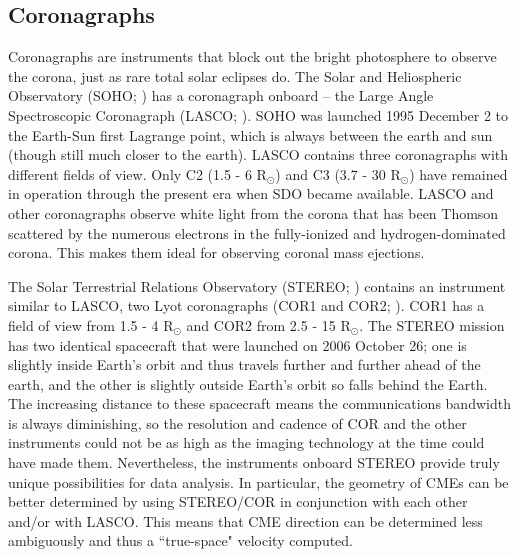 \subsection{Coronagraphs}
Coronagraphs are instruments that block out the bright photosphere to observe the corona, just as rare total solar eclipses do. The Solar and Heliospheric Observatory (SOHO; \citealt{Domingo1995}) has a coronagraph onboard -- the Large Angle Spectroscopic Coronagraph (LASCO; \citealt{Brueckner1995}). SOHO was launched 1995 December 2 to the Earth-Sun first Lagrange point, which is always between the earth and sun (though still much closer to the earth). LASCO contains three coronagraphs with different fields of view. Only C2 (1.5 - 6 R$_\odot$) and C3 (3.7 - 30 R$_\odot$) have remained in operation through the present era when SDO became available. LASCO and other coronagraphs observe white light from the corona that has been Thomson scattered by the numerous electrons in the fully-ionized and hydrogen-dominated corona. This makes them ideal for observing coronal mass ejections. 

The Solar Terrestrial Relations Observatory (STEREO; \citealt{Kaiser2007}) contains an instrument similar to LASCO, two Lyot coronagraphs (COR1 and COR2; \citealt{Howard2008}). COR1 has a field of view from 1.5 - 4 R$_\odot$ and COR2 from 2.5 - 15 R$_\odot$. The STEREO mission has two identical spacecraft that were launched on 2006 October 26; one is slightly inside Earth's orbit and thus travels further and further ahead of the earth, and the other is slightly outside Earth's orbit so falls behind the Earth. The increasing distance to these spacecraft means the communications bandwidth is always diminishing, so the resolution and cadence of COR and the other instruments could not be as high as the imaging technology at the time could have made them. Nevertheless, the instruments onboard STEREO provide truly unique possibilities for data analysis. In particular, the geometry of CMEs can be better determined by using STEREO/COR in conjunction with each other and/or with LASCO. This means that CME direction can be determined less ambiguously and thus a ``true-space" velocity computed. 

